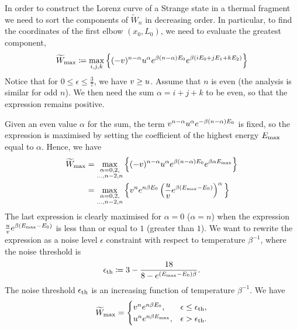 \documentclass[pra,
aps,
twocolumn,
superscriptaddress,
groupedaddress,
nofootinbib,
reprint
]{revtex4-1}
\begin{document}
In order to construct the Lorenz curve of a Strange state in a thermal fragment we need to sort the components of $\widetilde{W}_n$ in decreasing order.
In particular, to find the coordinates of the first elbow $(x_0, L_0)$, we need to evaluate the greatest component,
\begin{equation}\label{eq:max_slope}
	\widetilde{W}_{\rm{max}} \coloneqq \max\limits_{i,j,k}{\Big\{ (-v)^{n-\alpha} u^{\alpha} e^{\beta (n-\alpha)E_0} e^{\beta ( i E_0 + j E_1 + k E_2 )} \Big\}}
\end{equation}
Notice that for $0 \leq \epsilon \leq \frac{3}{7}$, we have $v \geq u$.
Assume that $n$ is even (the analysis is similar for odd $n$). 
We then need the sum $\alpha = i+j+k$ to be even, so that the expression remains positive.

Given an even value $\alpha$ for the sum, the term $v^{n-\alpha} u^{\alpha} e^{-\beta (n-\alpha)E_0}$ is fixed, so the expression is maximised by setting the coefficient of the highest energy $E_{\rm{max}}$ equal to $\alpha$.
Hence, we have
\begin{align}
	\widetilde{W}_{\rm{max}} &= \max\limits_{\substack{\alpha = 0,2, \\ \dots,n-2,n}}{\Big\{ (-v)^{n-\alpha} u^{\alpha} e^{\beta (n-\alpha)E_0} e^{\beta \alpha E_{\rm{max}}} \Big\}} \\
	&= \max\limits_{\substack{\alpha = 0,2, \\ \dots,n-2,n}}{\Big\{ v^n e^{n\beta E_0} \left( \frac{u}{v} e^{\beta (E_{\rm{max}} - E_0)} \right)^{\alpha} \Big\}}
\end{align}
The last expression is clearly maximised for $\alpha = 0$ ($\alpha = n$) when the expression $\frac{u}{v} e^{\beta (E_{\rm{max}} - E_0)}$ is less than or equal to $1$ (greater than $1$).
We want to rewrite the expression as a noise level $\epsilon$ constraint with respect to temperature $\beta^{-1}$, where the noise threshold is
\begin{equation}
	\epsilon_{\rm{th}} \coloneqq 3 - \dfrac{18}{8-e^{(E_{\rm{max}} - E_0)\beta}}.
\end{equation}
The noise threshold $\epsilon_{\rm{th}}$ is an increasing function of temperature $\beta^{-1}$.
We have
\begin{equation}
\widetilde{W}_{\rm{max}} =
	\begin{cases}
		v^n e^{n\beta E_0}, &\epsilon \leq \epsilon_{\rm{th}}, 	\\
		u^n e^{n\beta E_{\rm{max}}}, &\epsilon > \epsilon_{\rm{th}}.
	\end{cases}
\end{equation}
\end{document}
